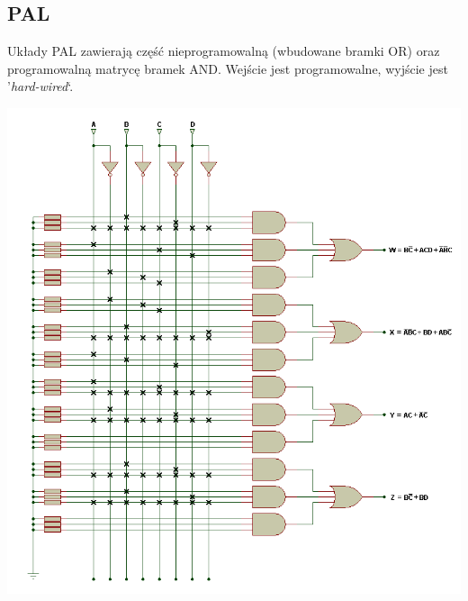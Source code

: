 \documentclass[12pt]{article}
\begin{document}
    \subsection{PAL}
        Układy PAL zawierają część nieprogramowalną (wbudowane bramki OR) oraz programowalną
        matrycę bramek AND.
        Wejście jest programowalne, wyjście jest '\textit{hard-wired}`.
            \begin{center}
                \includegraphics[scale=0.7]{graphics/pal.png}
            \end{center}     
            
\end{document}
